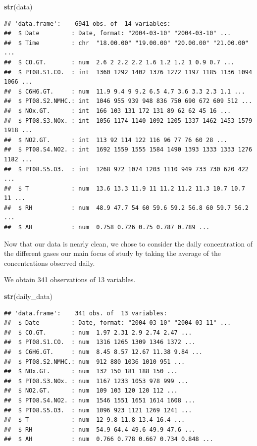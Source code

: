 \documentclass[]{article}
\newenvironment{Shaded}{\begin{snugshade}}{\end{snugshade}}
\newcommand{\KeywordTok}[1]{\textcolor[rgb]{0.13,0.29,0.53}{\textbf{#1}}}
\newcommand{\NormalTok}[1]{#1}
\begin{document}
\begin{Shaded}
\begin{Highlighting}[]
\KeywordTok{str}\NormalTok{(data)}
\end{Highlighting}
\end{Shaded}

\begin{verbatim}
## 'data.frame':    6941 obs. of  14 variables:
##  $ Date         : Date, format: "2004-03-10" "2004-03-10" ...
##  $ Time         : chr  "18.00.00" "19.00.00" "20.00.00" "21.00.00" ...
##  $ CO.GT.       : num  2.6 2 2.2 2.2 1.6 1.2 1.2 1 0.9 0.7 ...
##  $ PT08.S1.CO.  : int  1360 1292 1402 1376 1272 1197 1185 1136 1094 1066 ...
##  $ C6H6.GT.     : num  11.9 9.4 9 9.2 6.5 4.7 3.6 3.3 2.3 1.1 ...
##  $ PT08.S2.NMHC.: int  1046 955 939 948 836 750 690 672 609 512 ...
##  $ NOx.GT.      : int  166 103 131 172 131 89 62 62 45 16 ...
##  $ PT08.S3.NOx. : int  1056 1174 1140 1092 1205 1337 1462 1453 1579 1918 ...
##  $ NO2.GT.      : int  113 92 114 122 116 96 77 76 60 28 ...
##  $ PT08.S4.NO2. : int  1692 1559 1555 1584 1490 1393 1333 1333 1276 1182 ...
##  $ PT08.S5.O3.  : int  1268 972 1074 1203 1110 949 733 730 620 422 ...
##  $ T            : num  13.6 13.3 11.9 11 11.2 11.2 11.3 10.7 10.7 11 ...
##  $ RH           : num  48.9 47.7 54 60 59.6 59.2 56.8 60 59.7 56.2 ...
##  $ AH           : num  0.758 0.726 0.75 0.787 0.789 ...
\end{verbatim}

Now that our data is nearly clean, we chose to consider the daily
concentration of the different gases our main focus of study by taking
the average of the concentrations observed daily.

We obtain 341 observations of 13 variables.

\begin{Shaded}
\begin{Highlighting}[]
\KeywordTok{str}\NormalTok{(daily_data)}
\end{Highlighting}
\end{Shaded}

\begin{verbatim}
## 'data.frame':    341 obs. of  13 variables:
##  $ Date         : Date, format: "2004-03-10" "2004-03-11" ...
##  $ CO.GT.       : num  1.97 2.31 2.9 2.74 2.47 ...
##  $ PT08.S1.CO.  : num  1316 1265 1309 1346 1372 ...
##  $ C6H6.GT.     : num  8.45 8.57 12.67 11.38 9.84 ...
##  $ PT08.S2.NMHC.: num  912 880 1036 1010 951 ...
##  $ NOx.GT.      : num  132 150 181 188 150 ...
##  $ PT08.S3.NOx. : num  1167 1233 1053 978 999 ...
##  $ NO2.GT.      : num  109 103 120 120 112 ...
##  $ PT08.S4.NO2. : num  1546 1551 1651 1614 1608 ...
##  $ PT08.S5.O3.  : num  1096 923 1121 1269 1241 ...
##  $ T            : num  12 9.8 11.8 13.4 16.4 ...
##  $ RH           : num  54.9 64.4 49.6 49.9 47.6 ...
##  $ AH           : num  0.766 0.778 0.667 0.734 0.848 ...
\end{verbatim}
\end{document}
